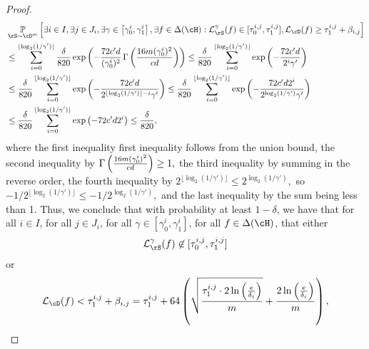 \begin{proof}
\begin{align*}
        &\p_{\rS\sim\cD^{m}}\Big[\exists i\in I, \exists j\in J_{i},
        \exists \gamma \in \left[\gamma_{0}^{i},\gamma_{1}^{i}\right]
        ,\exists f\in \dlh: 
        \ls_{\rS}^{\gamma}(f)\in [\tau_{0}^{i,j},\tau_{1}^{i,j}] 
        ,\ls_{\cD}(f) \geq \tau_{1}^{i,j} 
        + \beta_{i,j}
        \Big]\\
        &\leq
         \sum_{i=0}^{\lfloor\log_{2}(  1/\gamma')\rfloor}   \frac{\delta}{820}\exp{\left(-\frac{72 c'd}{ (\gamma_{0}^{i})^{2}} \func{\left(  \frac{16 m(\gamma_{0}^{i})^{2}}{cd} \right)} \right)}
         \leq\frac{\delta}{820} 
         \sum_{i=0}^{\lfloor\log_{2}(  1/\gamma')\rfloor}
          \exp{\left(-\frac{72c'd}{2^{i}\gamma'} \right)} 
          \\
         &\leq
         \frac{\delta}{820} \sum_{i=0}^{\lfloor\log_{2}(  1/\gamma')\rfloor}
         \exp{\left(-\frac{72c'd}{2^{\lfloor\log_{2}(  1/\gamma')\rfloor-i}\gamma'} \right)} 
          \leq
         \frac{\delta}{820} \sum_{i=0}^{\lfloor\log_{2}(  1/\gamma')\rfloor}
         \exp{\left(-\frac{72c'd2^{i}}{2^{\log_{2}(  1/\gamma' )}\gamma'} \right)}
         \\
         &\leq
        \frac{\delta}{820} \sum_{i=0}^{\lfloor\log_{2}(  1/\gamma')\rfloor}
        \exp{\left(-72c'd 2^{i} \right)}
           \leq \frac{\delta}{820},
    \end{align*}
    where the first inequality first inequality follows from the union bound, the second inequality by $ \operatorname{\Gamma}{\left(  \frac{16 m(\gamma_{0}^{i})^{2}}{cd} \right)} \geq 1,$  the third inequality by summing in the reverse order, the fourth inequality by $ 2^{\lfloor\log_{2}(  1/\gamma')\rfloor}\leq2^{\log_{2}(  1/\gamma')},$ so  $ -1/2^{\lfloor\log_{2}(  1/\gamma')\rfloor}\leq-1/2^{\log_{2}(  1/\gamma')},$ and the last inequality by the sum being less than 1.
    Thus, we conclude that with probability at least $ 1-\delta$, we have that for all $ i\in I$, for  all $j\in J_{i}$,  for all
    $\gamma \in \left[\gamma_{0}^{i},\gamma_{1}^{i}\right]$,  for all
    $f\in \dlh$, that either 
    \begin{align*}
        \ls_{\rS}^{\gamma}(f)\not\in [\tau_{0}^{i,j},\tau_{1}^{i,j}] 
    \end{align*}
    or
    \begin{align*}
        \ls_{\cD}(f) <\tau_{1}^{i,j} 
        + \beta_{i,j}= \tau_{1}^{i,j} 
        + \cc\left(\sqrt{\frac{\tau_{1}^{i,j}\cdot 2 \ln{\left(\frac{e}{\delta_{i}} \right)}}{m}} 
        +\frac{2\ln{\left(\frac{e}{\delta_{i}} \right)}}{m}\right),
    \end{align*}

\end{proof}
